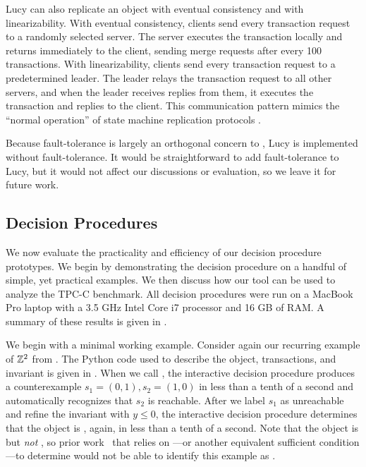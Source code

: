 Lucy can also replicate an object with eventual consistency and with
linearizability. With eventual consistency, clients send every transaction
request to a randomly selected server. The server executes the transaction
locally and returns immediately to the client, sending merge requests after
every 100 transactions. With linearizability, clients send every transaction
request to a predetermined leader. The leader relays the transaction request to
all other servers, and when the leader receives replies from them, it executes
the transaction and replies to the client. This communication pattern mimics
the ``normal operation'' of state machine replication protocols
\cite{lamport1998part, liskov2012viewstamped}.

Because fault-tolerance is largely an orthogonal concern to
\invariantconfluence{}, Lucy is implemented without fault-tolerance. It would
be straightforward to add fault-tolerance to Lucy, but it would not affect our
discussions or evaluation, so we leave it for future work.

\subsection{Decision Procedures}
We now evaluate the practicality and efficiency of our decision procedure
prototypes. We begin by demonstrating the decision procedure on a handful of
simple, yet practical examples. We then discuss how our tool can be used to
analyze the TPC-C benchmark. All decision procedures were run on a MacBook Pro
laptop with a 3.5 GHz Intel Core i7 processor and 16 GB of RAM. A summary of
these results is given in .

{}

\example[$\ints^2$]
We begin with a minimal working example. Consider again our recurring example
of $\ints^2$ from . The Python code used to describe the object,
transactions, and invariant is given in . When we call
, the interactive decision procedure produces a
counterexample $s_1 = (0, 1), s_2 = (1, 0)$ in less than a tenth of a second
and automatically recognizes that $s_2$ is reachable. After we label $s_1$ as
unreachable and refine the invariant with $y \leq 0$, the interactive decision
procedure determines that the object is \invariantconfluent{}, again, in less
than a tenth of a second. Note that the object is \invariantconfluent{} but
\emph{not} \invariantclosed{}, so prior work~\cite{li2012making,
li2014automating, balegas2015towards, gotsman2016cause} that relies on
\invariantclosure{}---or another equivalent sufficient condition---to determine
\invariantconfluence{} would not be able to identify this example as
\invariantconfluent{}.

